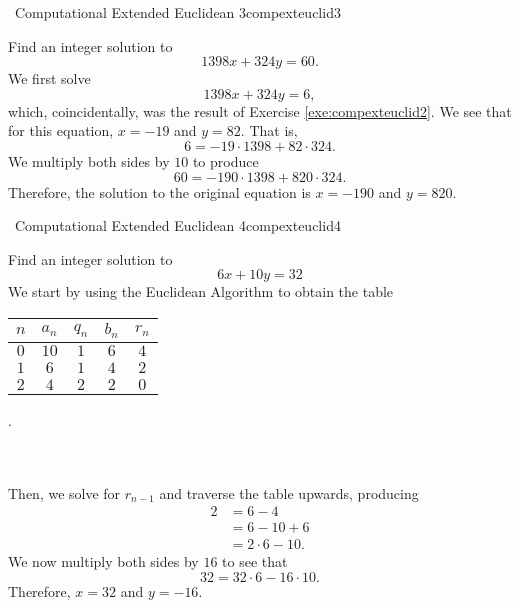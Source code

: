     \begin{exercise}{\Difficulty\,\Difficulty\,\,Computational Extended Euclidean 3}{compexteuclid3}
    
        Find an integer solution to
        \begin{equation*}
            1398x+324y=60.
        \end{equation*}
        We first solve 
        \begin{equation*}
            1398x+324y=6,
        \end{equation*}
        which, coincidentally, was the result of Exercise \ref{exe:compexteuclid2}. We see that for this equation, \(x=-19\) and \(y=82\). That is,
        \begin{equation*}
            6=-19\cdot1398+82\cdot324.
        \end{equation*}
        We multiply both sides by \(10\) to produce
        \begin{equation*}
            60=-190\cdot1398+820\cdot324.
        \end{equation*}
        Therefore, the solution to the original equation is \(x=-190\) and \(y=820\).
    
    \end{exercise}
    \begin{exercise}{\Difficulty\,\Difficulty\,\,Computational Extended Euclidean 4}{compexteuclid4}
    
        Find an integer solution to
        \begin{equation*}
            6x+10y=32
        \end{equation*}
        We start by using the Euclidean Algorithm to obtain the table
        \begin{center}
            \begin{tabular}{c|c|c|c|c}
                \hline
                \(n\) & \(a_n\) & \(q_n\) & \(b_n\) & \(r_n\) \\
                \hline
                \(0\) & \(10\) & \(1\) & \(6\) & \(4\) \\
                \(1\) & \(6\) & \(1\) & \(4\) & \(2\) \\
                \(2\) & \(4\) & \(2\) & \(2\) & \(0\) \\
                \hline
            \end{tabular}.
        \end{center}
        \vphantom
        \\
        \\
        Then, we solve for \(r_{n-1}\) and traverse the table upwards, producing
        \begin{align*}
            2&=6-4 \\
            &=6-10+6 \\
            &=2\cdot6-10.
        \end{align*}
        We now multiply both sides by \(16\) to see that
        \begin{equation*}
            32=32\cdot6-16\cdot10.
        \end{equation*}
        Therefore, \(x=32\) and \(y=-16\).
    
    \end{exercise}